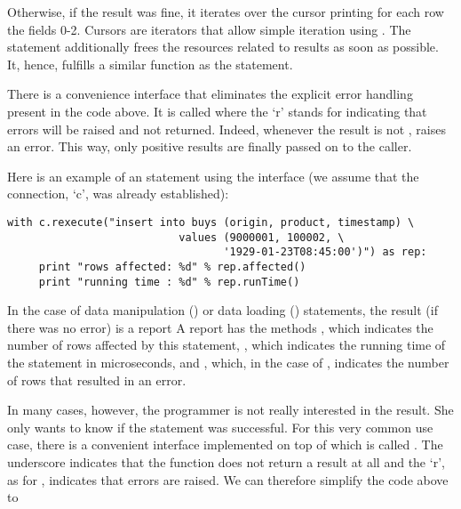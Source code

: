 Otherwise, if the result was fine,
it iterates over the cursor
printing for each row the fields 0-2.
Cursors are iterators
that allow simple iteration using .
The  statement additionally frees
the resources related to  results
as soon as possible. It, hence, fulfills
a similar function as the  statement.

There is a convenience interface that
eliminates the explicit error handling
present in the code above.
It is called 
where the `r' stands for 
indicating that errors will be raised
and not returned.
Indeed, whenever the result is not ,
 raises an error.
This way, only positive results are finally
passed on to the caller.

\begin{minipage}{\textwidth}
Here is an example of an  statement
using the  interface
(we assume that the connection, `c', was already established):

\begin{python}
\begin{lstlisting}
with c.rexecute("insert into buys (origin, product, timestamp) \
                           values (9000001, 100002, \
                                  '1929-01-23T08:45:00')") as rep:
     print "rows affected: %d" % rep.affected()
     print "running time : %d" % rep.runTime()
\end{lstlisting}
\end{python}
\end{minipage}

In the case of data manipulation ()
or data loading () statements,
the result (if there was no error) is a report
A report has the methods \term{affected()},
which indicates the number of rows affected by this statement,
\term{runTime()},
which indicates the running time of the statement in microseconds,
and ,
which, in the case of \term{load},
indicates the number of rows that resulted in an error.

In many cases, however, the programmer is not really interested
in the result. She only wants to know if the statement was
successful. For this very common use case, there is a convenient
interface implemented on top of  which is called
\term{rexecute\_}. The underscore indicates that the function
does not return a result at all and the `r', as for \term{rexecute},
indicates that errors are raised.
We can therefore simplify the code above to  

